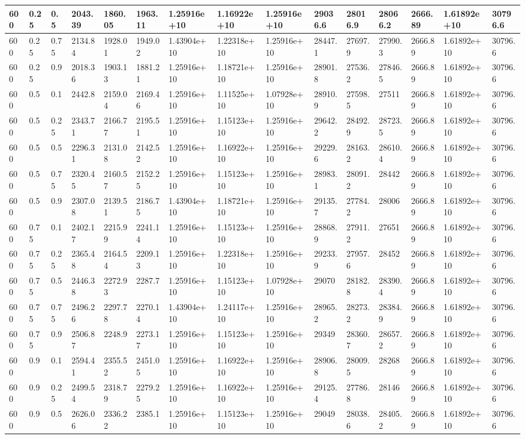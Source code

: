 \begin{table}[!htbp]
\begin{tabularx}{\textwidth}{|p{0.4cm}|*{2}{p{0.2cm}|}*{12}{X|}}
600&0.25&0.5&2043.39&1860.05&1963.11&1.25916e+10&1.16922e+10&1.25916e+10&29036.6&28016.9&28066.2&2666.89&1.61892e+10&30796.6\\\hline
600&0.25&0.75&2134.84&1928.01&1949.02&1.43904e+10&1.22318e+10&1.25916e+10&28447.1&27697.9&27990.3&2666.89&1.61892e+10&30796.6\\\hline
600&0.25&0.9&2018.36&1903.13&1881.21&1.25916e+10&1.18721e+10&1.25916e+10&28901.8&27536.2&27846.5&2666.89&1.61892e+10&30796.6\\\hline
600&0.5&0.1&2442.8&2159.04&2169.46&1.25916e+10&1.11525e+10&1.07928e+10&28910.9&27598.5&27511&2666.89&1.61892e+10&30796.6\\\hline
600&0.5&0.25&2343.71&2166.77&2195.51&1.25916e+10&1.15123e+10&1.25916e+10&29642.2&28492.9&28723.5&2666.89&1.61892e+10&30796.6\\\hline
600&0.5&0.5&2296.31&2131.08&2142.52&1.25916e+10&1.16922e+10&1.25916e+10&29229.6&28163.2&28610.4&2666.89&1.61892e+10&30796.6\\\hline
600&0.5&0.75&2320.45&2160.57&2152.25&1.25916e+10&1.15123e+10&1.25916e+10&28983.1&28091.2&28442&2666.89&1.61892e+10&30796.6\\\hline
600&0.5&0.9&2307.08&2139.51&2186.75&1.43904e+10&1.18721e+10&1.25916e+10&29135.7&27784.2&28006&2666.89&1.61892e+10&30796.6\\\hline
600&0.75&0.1&2402.17&2215.99&2241.14&1.25916e+10&1.15123e+10&1.25916e+10&28868.9&27911.2&27651&2666.89&1.61892e+10&30796.6\\\hline
600&0.75&0.25&2365.48&2164.54&2209.13&1.25916e+10&1.22318e+10&1.25916e+10&29233.9&27957.6&28452&2666.89&1.61892e+10&30796.6\\\hline
600&0.75&0.5&2446.38&2272.93&2287.7&1.25916e+10&1.15123e+10&1.07928e+10&29070&28182.8&28390.4&2666.89&1.61892e+10&30796.6\\\hline
600&0.75&0.75&2496.26&2297.78&2270.14&1.43904e+10&1.24117e+10&1.25916e+10&28965.2&28273.2&28384.9&2666.89&1.61892e+10&30796.6\\\hline
600&0.75&0.9&2506.87&2248.9&2273.17&1.25916e+10&1.15123e+10&1.25916e+10&29349&28360.7&28657.2&2666.89&1.61892e+10&30796.6\\\hline
600&0.9&0.1&2594.41&2355.52&2451.05&1.25916e+10&1.16922e+10&1.25916e+10&28906.8&28009.5&28268&2666.89&1.61892e+10&30796.6\\\hline
600&0.9&0.25&2499.54&2318.79&2279.25&1.25916e+10&1.16922e+10&1.25916e+10&29125.4&27786.8&28146&2666.89&1.61892e+10&30796.6\\\hline
600&0.9&0.5&2626.06&2336.22&2385.1&1.25916e+10&1.15123e+10&1.25916e+10&29049&28038.6&28405.2&2666.89&1.61892e+10&30796.6\\\hline

\end{tabularx}
\end{table}
